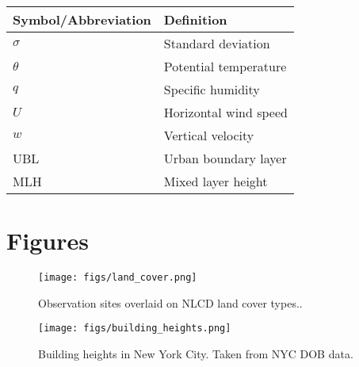 \documentclass[11pt,a4paper]{article}
\begin{document}
\label{tab:symbols}
\begin{center}
	\begin{tabularx}{0.5\textwidth}{l X}
 		\hline
 		Symbol/Abbreviation & Definition \\
 		\hline
 		$\sigma$ & Standard deviation \\
 		$\theta$ & Potential temperature \\
 		$q$ & Specific humidity \\
 		$U$ & Horizontal wind speed \\
 		$w$ & Vertical velocity \\
 		UBL & Urban boundary layer \\
 		MLH & Mixed layer height \\
 		\hline
	\end{tabularx}
\end{center}

\section*{Figures}

\begin{figure}[ht]
	\centering
	\texttt{[image: figs/land\_cover.png]}
	\caption{Observation sites overlaid on NLCD land cover types..}
	\label{fig:land_cover}
\end{figure}
 
\begin{figure}[ht]
	\centering
	\texttt{[image: figs/building\_heights.png]}
	\caption{Building heights in New York City. Taken from NYC DOB data.}
	\label{fig:building_heights}
\end{figure}
\end{document}
